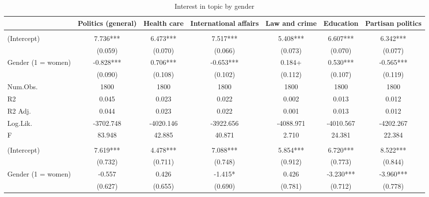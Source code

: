\documentclass[
  letterpaper,
  DIV=11,
  numbers=noendperiod]{scrreprt}
\begin{document}
\begin{table}

\caption{Interest in topic by gender }
\centering
\fontsize{6}{8}\selectfont
\begin{tabular}[t]{lcccccc}
\toprule
  & Politics (general) & Health care & International affairs & Law and crime & Education & Partisan politics\\
\midrule
\addlinespace[0.5em]
\multicolumn{7}{l}{\textit{Without Controls}}\\
\midrule \hspace{1em}(Intercept) & 7.736*** & 6.473*** & 7.517*** & 5.408*** & 6.607*** & 6.342***\\
\hspace{1em} & (0.059) & (0.070) & (0.066) & (0.073) & (0.070) & (0.077)\\
\hspace{1em}Gender (1 = women) & -0.828*** & 0.706*** & -0.653*** & 0.184+ & 0.530*** & -0.565***\\
\hspace{1em} & (0.090) & (0.108) & (0.102) & (0.112) & (0.107) & (0.119)\\
\hspace{1em}Num.Obs. & 1800 & 1800 & 1800 & 1800 & 1800 & \vphantom{1} 1800\\
\hspace{1em}R2 & 0.045 & 0.023 & 0.022 & 0.002 & 0.013 & 0.012\\
\hspace{1em}R2 Adj. & 0.044 & 0.023 & 0.022 & 0.001 & 0.013 & 0.012\\
\hspace{1em}Log.Lik. & -3702.748 & -4020.146 & -3922.656 & -4088.971 & -4010.567 & -4202.267\\
\hspace{1em}F & 83.948 & 42.885 & 40.871 & 2.710 & 24.381 & 22.384\\
\addlinespace[0.5em]
\multicolumn{7}{l}{\textit{With Controls}}\\
\midrule \hspace{1em}(Intercept) & 7.619*** & 4.478*** & 7.088*** & 5.854*** & 6.720*** & 8.522***\\
\hspace{1em} & (0.732) & (0.711) & (0.748) & (0.912) & (0.773) & (0.844)\\
\hspace{1em}Gender (1 = women) & -0.557 & 0.426 & -1.415* & 0.426 & -3.230*** & -3.960***\\
\hspace{1em} & (0.627) & (0.655) & (0.690) & (0.781) & (0.712) & (0.778)\\

\end{tabular}
\end{table}
\end{document}
